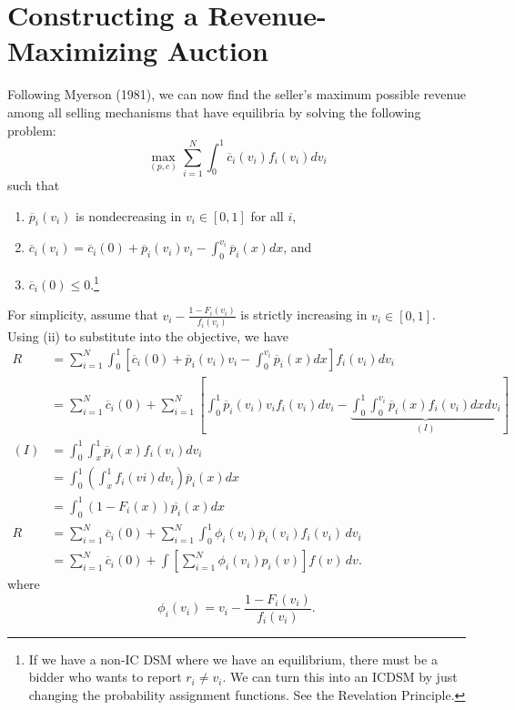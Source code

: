 
\section{Constructing a Revenue-Maximizing Auction}

Following Myerson (1981), we can now find the seller's maximum possible revenue among all selling mechanisms that have equilibria by solving the following problem: \[
	\max_{(p,c)} \sum\limits_{i=1}^{N} \int_0^1 \overline{c}_i (v_i) f_i(v_i)dv_i		
\] such that
\begin{enumerate}[label=(\roman*)]
	\item $\overline{p}_i(v_i)$ is nondecreasing in $ v_i \in [0,1]$ for all $i$,
	\item $\overline{c}_i(v_i) = \overline{c}_i(0) + \overline{p}_i(v_i) v_i - \int_{0}^{v_i} \overline{p}_i(x)dx $, and
	\item $\overline{c}_i(0) \le 0$.\footnote{If we have a non-IC DSM where we have an equilibrium, there must be a bidder who wants to report $r_i \ne v_i$. We can turn this into an ICDSM by just changing the probability assignment functions. See the Revelation Principle.}
\end{enumerate}

For simplicity, assume that $v_i - \frac{1-F_i(v_i)}{f_i(v_i)}$ is strictly increasing in $v_i \in [0,1]$. Using (ii) to substitute into the objective, we have
\begin{align*}
	R &= \sum\limits_{i=1}^{N} \int_{0}^{1}  \left[ \overline{c}_i(0) + \overline{p}_i(v_i)v_i - \int_{0}^{v_i} \overline{p}_i(x)dx  \right] f_i(v_i)dv_i  \\
	&= \sum\limits_{i=1}^{N} \overline{c}_i(0) + \sum\limits_{i=1}^{N} \left[ \int_{0}^{1} \overline{p}_{i}(v_i) v_i f_i(v_i)dv_i - \underbrace{\int_{0}^{1} \int_{0}^{v_i} \overline{p}_i(x)f_i(v_i)dxdv_i  }_{(I)}  \right] \\
	(I) &= \int_{0}^{1} \int_{x}^{1} \overline{p}_i(x)f_i(v_i)dv_i   \\
	&= \int_{0}^{1} \left( \int_{x}^{1} f_i(vi)dv_i  \right) \overline{p}_i (x)dx   \\
	&= \int_{0}^{1} (1-F_i(x)) \overline{p_i}(x)dx \\
	R &= \sum\limits_{i=1}^{N} \overline{c}_i(0) + \sum\limits_{i=1}^{N} \int_{0}^{1} \phi_i(v_i)\overline{p}_i(v_i) f_i(v_i)\,dv_i \\
	  &= \sum\limits_{i=1}^{N} \overline{c}_i(0) + \int \left[ \sum\limits_{i=1}^{N} \phi_i(v_i)p_i(v) \right] f(v)\, dv
	.\end{align*}
	where
	\[
		\phi_i(v_i) = v_i - \frac{1-F_i(v_i)}{f_i(v_i)}.
	\]

